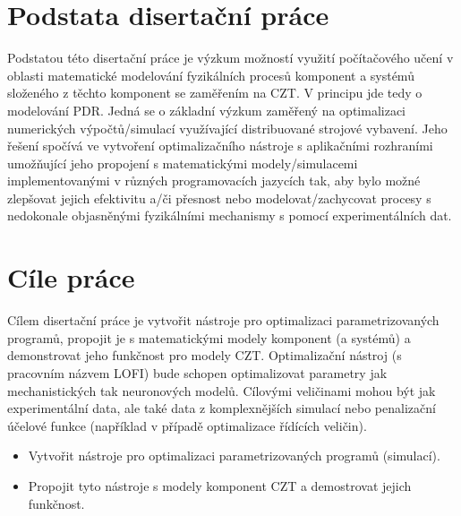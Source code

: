 \section{Podstata disertační práce}
\label{sec:Podstata}
Podstatou této disertační práce je výzkum možností využití počítačového učení
v oblasti matematické modelování fyzikálních procesů komponent a systémů
složeného z těchto komponent se zaměřením na CZT. V principu jde tedy o
modelování PDR. Jedná se o základní výzkum zaměřený na optimalizaci
numerických výpočtů/simulací využívající distribuované strojové vybavení.
Jeho řešení spočívá ve vytvoření optimalizačního nástroje s aplikačními
rozhraními umožňující jeho propojení s matematickými modely/simulacemi
implementovanými v různých programovacích jazycích tak, aby bylo možné
zlepšovat jejich efektivitu a/či přesnost nebo modelovat/zachycovat procesy s
nedokonale objasněnými fyzikálními mechanismy s pomocí experimentálních dat.
\section{Cíle práce}
\label{sec:Aims}
Cílem disertační práce je vytvořit nástroje pro optimalizaci parametrizovaných
programů, propojit je s matematickými modely komponent (a systémů) a
demonstrovat jeho funkčnost pro modely CZT. Optimalizační nástroj (s pracovním
názvem LOFI) bude schopen optimalizovat parametry jak mechanistických tak
neuronových modelů. Cílovými veličinami mohou být jak experimentální data, ale
také data z komplexnějších simulací nebo penalizační účelové funkce (například
v případě optimalizace řídících veličin).
\begin{itemize}
  \item
    Vytvořit nástroje pro optimalizaci parametrizovaných programů (simulací).
  \item
    Propojit tyto nástroje s modely komponent CZT a demostrovat jejich
    funkčnost.
\end{itemize}
